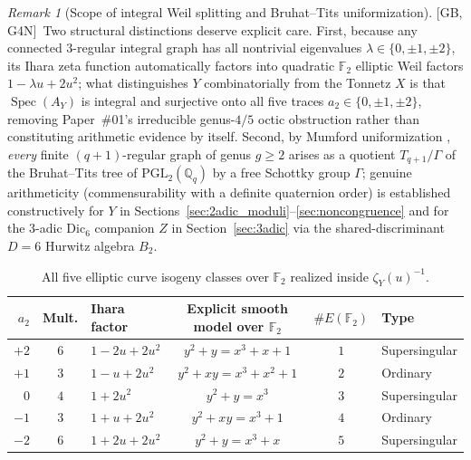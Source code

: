 \documentclass[11pt]{amsart}
\numberwithin{equation}{section}
\theoremstyle{plain}
\theoremstyle{definition}\newtheorem{definition}[theorem]{Definition}
\theoremstyle{remark}\newtheorem{remark}[theorem]{Remark}
\newcommand{\Q}{\mathbb{Q}}
\newcommand{\F}{\mathbb{F}}
\newcommand{\PGL}{\mathrm{PGL}}
\newcommand{\ctag}[1]{\textup{\textsf{\scriptsize[#1]}}}
\begin{document}
\begin{remark}[Scope of integral Weil splitting and Bruhat--Tits uniformization]\label{rem:framing_scope}
\ctag{GB, G4N}\ Two structural distinctions deserve explicit care. First, because any connected $3$-regular integral graph has all nontrivial eigenvalues $\lambda\in\{0,\pm 1,\pm 2\}$, its Ihara zeta function automatically factors into quadratic $\F_2$ elliptic Weil factors $1-\lambda u+2u^2$; what distinguishes $Y$ combinatorially from the Tonnetz $X$ is that $\operatorname{Spec}(A_Y)$ is integral and surjective onto all five traces $a_2\in\{0,\pm 1,\pm 2\}$, removing Paper~\#01's irreducible genus-$4/5$ octic obstruction rather than constituting arithmetic evidence by itself. Second, by Mumford uniformization \cite{mumford1972,serre1980}, \emph{every} finite $(q+1)$-regular graph of genus $g\ge 2$ arises as a quotient $T_{q+1}/\Gamma$ of the Bruhat--Tits tree of $\PGL_2(\Q_q)$ by a free Schottky group $\Gamma$; genuine arithmeticity (commensurability with a definite quaternion order) is established constructively for $Y$ in Sections~\ref{sec:2adic_moduli}--\ref{sec:noncongruence} and for the $3$-adic $\mathrm{Dic}_6$ companion $Z$ in Section~\ref{sec:3adic} via the shared-discriminant $D=6$ Hurwitz algebra $B_2$.
\end{remark}

\begin{table}[t]
\centering\footnotesize\setlength{\tabcolsep}{5pt}
\caption{All five elliptic curve isogeny classes over $\F_2$ realized inside $\zeta_Y(u)^{-1}$.}
\label{tab:f2_elliptic}
\begin{tabular}{rclccl}\toprule
$a_2$ & Mult. & Ihara factor & Explicit smooth model over $\F_2$ & $\#E(\F_2)$ & Type \\\midrule
$+2$ & $6$ & $1-2u+2u^2$ & $y^2+y=x^3+x+1$ & $1$ & Supersingular \\
$+1$ & $3$ & $1-u+2u^2$ & $y^2+xy=x^3+x^2+1$ & $2$ & Ordinary \\
$0$ & $4$ & $1+2u^2$ & $y^2+y=x^3$ & $3$ & Supersingular \\
$-1$ & $3$ & $1+u+2u^2$ & $y^2+xy=x^3+1$ & $4$ & Ordinary \\
$-2$ & $6$ & $1+2u+2u^2$ & $y^2+y=x^3+x$ & $5$ & Supersingular \\\bottomrule
\end{tabular}
\end{table}
\end{document}
